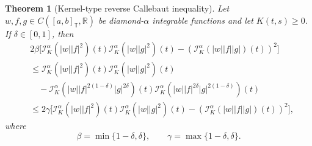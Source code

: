 \documentclass[11pt]{article}
\newtheorem{theorem}{Theorem}[section]
\begin{document}
\begin{theorem}[Kernel-type reverse Callebaut inequality]
Let $w,f,g\in C([a,b]_{\mathbb{T}},\mathbb{R})$ be diamond-$\alpha$ integrable
functions and let $K(t,s)\geq0$. If $\delta\in[0,1]$, then
\[
\begin{aligned}
&2\beta\bigg[
\mathcal{I}_{K}^{\alpha}(|w||f|^2)(t)
\mathcal{I}_{K}^{\alpha}(|w||g|^2)(t)
-
\left(\mathcal{I}_{K}^{\alpha}(|w||f||g|)(t)\right)^2
\bigg]   \\
&\leq
\mathcal{I}_{K}^{\alpha}(|w||f|^2)(t)
\mathcal{I}_{K}^{\alpha}(|w||g|^2)(t)                                      \\
&\quad -
\mathcal{I}_{K}^{\alpha}
\left(|w||f|^{2(1-\delta)}|g|^{2\delta}\right)(t)
\mathcal{I}_{K}^{\alpha}
\left(|w||f|^{2\delta}|g|^{2(1-\delta)}\right)(t)                            \\
&\leq
2\gamma\bigg[
\mathcal{I}_{K}^{\alpha}(|w||f|^2)(t)
\mathcal{I}_{K}^{\alpha}(|w||g|^2)(t)
-
\left(\mathcal{I}_{K}^{\alpha}(|w||f||g|)(t)\right)^2
\bigg],
\end{aligned}
\]
where
\[
    \beta=\min\{1-\delta,\delta\},
    \qquad
    \gamma=\max\{1-\delta,\delta\}.
\]
\end{theorem}
\end{document}
